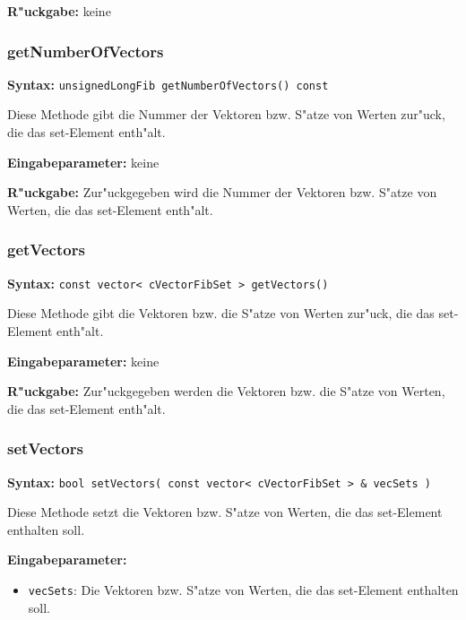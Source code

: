 \bigskip\noindent
\textbf{R"uckgabe:} keine


\subsubsection{getNumberOfVectors}

\textbf{Syntax:} \verb|unsignedLongFib getNumberOfVectors() const|

\bigskip\noindent
Diese Methode gibt die Nummer der Vektoren bzw. S"atze von Werten zur"uck, die das set-Element enth"alt.

\bigskip\noindent
\textbf{Eingabeparameter:} keine

\bigskip\noindent
\textbf{R"uckgabe:} Zur"uckgegeben wird die Nummer der Vektoren bzw. S"atze von Werten, die das set-Element enth"alt.


\subsubsection{getVectors}

\textbf{Syntax:} \verb|const vector< cVectorFibSet > getVectors()|

\bigskip\noindent
Diese Methode gibt die Vektoren bzw. die S"atze von Werten zur"uck, die das set-Element enth"alt.

\bigskip\noindent
\textbf{Eingabeparameter:} keine

\bigskip\noindent
\textbf{R"uckgabe:} Zur"uckgegeben werden die Vektoren bzw. die S"atze von Werten, die das set-Element enth"alt.


\subsubsection{setVectors}

\textbf{Syntax:} \verb|bool setVectors( const vector< cVectorFibSet > & vecSets )|

\bigskip\noindent
Diese Methode setzt die Vektoren bzw. S"atze von Werten, die das set-Element enthalten soll.

\bigskip\noindent
\textbf{Eingabeparameter:}
\begin{itemize}
 \item \verb|vecSets|: Die Vektoren bzw. S"atze von Werten, die das set-Element enthalten soll.
\end{itemize}

